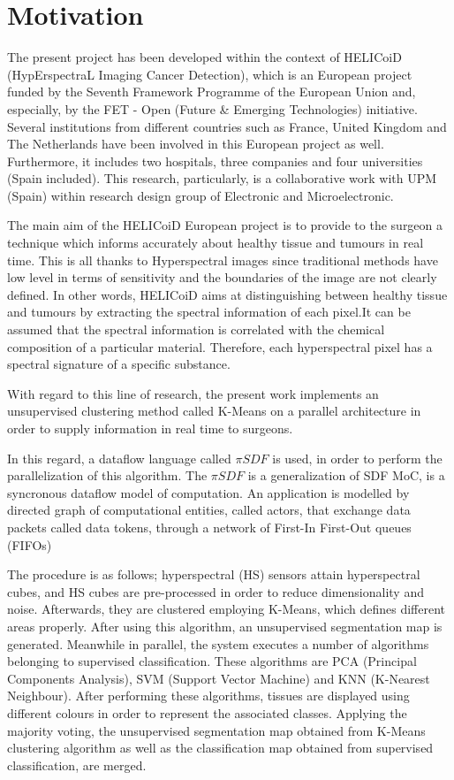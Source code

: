   \section{Motivation}
    The present project has been developed within the context of HELICoiD (HypErspectraL Imaging Cancer Detection), which is an European project funded by the Seventh Framework Programme of the European Union and, especially, by the FET - Open (Future \& Emerging Technologies) initiative. Several institutions from different countries such as France, United Kingdom and The Netherlands have been involved in this European project as well. Furthermore, it includes two hospitals, three companies and four universities (Spain included).  This research, particularly, is a collaborative work with UPM (Spain) within research design group of Electronic and Microelectronic.

The main aim of the HELICoiD European project is to provide to the surgeon a technique which informs accurately about healthy tissue and tumours in real time. This is all thanks to Hyperspectral images since traditional methods have low level in terms of sensitivity and the boundaries of the image are not clearly defined. In other words, HELICoiD aims at distinguishing between healthy tissue and tumours by extracting the spectral information of each pixel.It can be assumed that the spectral information is correlated with the chemical composition of a particular material. Therefore, each hyperspectral pixel has a spectral signature of a specific substance.

With regard to this line of research, the present work implements an unsupervised clustering method called K-Means on a parallel architecture in order to supply information in real time to surgeons. 

In this regard, a dataflow language called $\pi SDF$ is used, in order to perform the parallelization of this algorithm. The $\pi SDF$ is a generalization of SDF MoC, is a syncronous dataflow model of computation. An application is modelled by directed graph of computational entities, called actors, that exchange data packets called data tokens, through a
network of First-In First-Out queues (FIFOs)\cite{lee1987synchronous}

The procedure is as follows; hyperspectral (HS) sensors attain hyperspectral cubes, and HS cubes are pre-processed in order to reduce dimensionality and noise. Afterwards, they are clustered employing K-Means, which defines different areas properly. After using this algorithm, an unsupervised segmentation map is generated. 
Meanwhile in parallel, the system executes a number of algorithms belonging to supervised classification. These algorithms are PCA (Principal Components Analysis), SVM (Support Vector Machine) and KNN (K-Nearest Neighbour). After performing these algorithms, tissues are displayed using different colours in order to represent the associated classes. 
Applying the majority voting, the unsupervised segmentation map obtained from K-Means clustering algorithm as well as the classification map obtained from supervised classification, are merged. 

